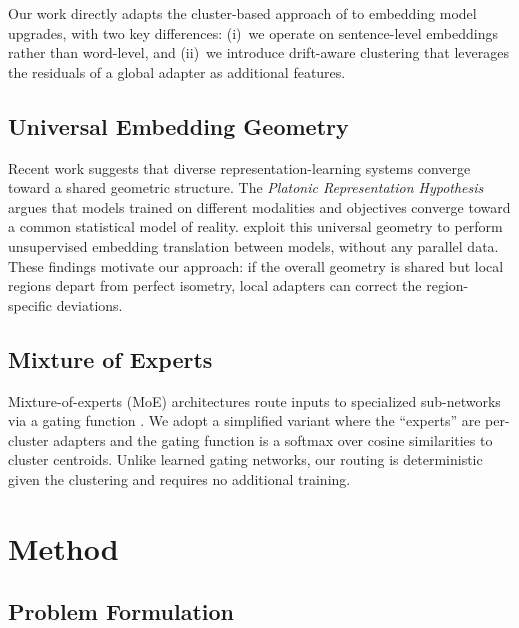 \documentclass[11pt,a4paper]{article}
\begin{document}
Our work directly adapts the cluster-based approach of \citet{dan2020cluster} to embedding model upgrades, with two key differences:
(i)~we operate on sentence-level embeddings rather than word-level, and
(ii)~we introduce drift-aware clustering that leverages the residuals of a global adapter as additional features.

\subsection{Universal Embedding Geometry}
\label{sec:related:geometry}

Recent work suggests that diverse representation-learning systems converge toward a shared geometric structure.
The \emph{Platonic Representation Hypothesis} \citep{huh2024platonic} argues that models trained on different modalities and objectives converge toward a common statistical model of reality.
\citet{jha2025universal} exploit this universal geometry to perform unsupervised embedding translation between models, without any parallel data.
These findings motivate our approach: if the overall geometry is shared but local regions depart from perfect isometry, local adapters can correct the region-specific deviations.

\subsection{Mixture of Experts}
\label{sec:related:moe}

Mixture-of-experts (MoE) architectures route inputs to specialized sub-networks via a gating function \citep{shazeer2017moe}.
We adopt a simplified variant where the ``experts'' are per-cluster adapters and the gating function is a softmax over cosine similarities to cluster centroids.
Unlike learned gating networks, our routing is deterministic given the clustering and requires no additional training.

\section{Method}
\label{sec:method}

\subsection{Problem Formulation}
\label{sec:method:formulation}
\end{document}
